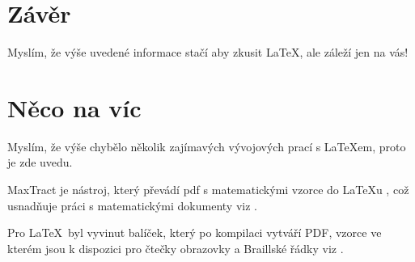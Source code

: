 \documentclass[a4paper,11pt]{article}
\begin{document}
\section{Závěr}
Myslím, že výše uvedené informace stačí aby zkusit  \LaTeX, ale záleží jen na vás!

\section{Něco na víc}
Myslím, že výše chybělo několik zajímavých vývojových prací s \LaTeX em, proto je zde uvedu.

MaxTract je nástroj, který převádí pdf s matematickými vzorce do \LaTeX u , což usnadňuje práci s matematickými dokumenty viz \cite{BakerJ.B}.

Pro \LaTeX ~byl vyvinut balíček, který po kompilaci vytváří PDF, vzorce ve kterém jsou k dispozici pro čtečky obrazovky a Braillské řádky viz \cite{Armano}.


\newpage
\newpage
\renewcommand{\refname}{Literatura}


\end{document}

